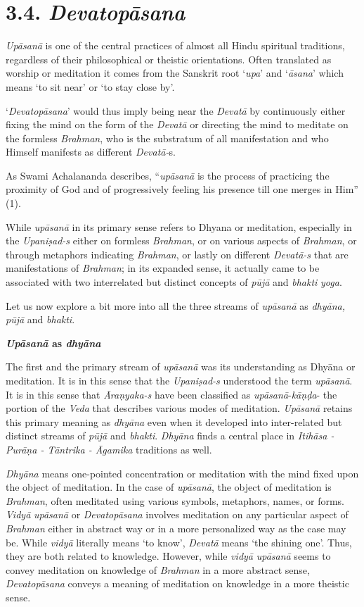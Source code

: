 \section*{3.4. \emph{Devatopāsana}}

\emph{Upāsanā} is one of the central practices of almost all Hindu spiritual traditions, regardless of their philosophical or theistic orientations. Often translated as worship or meditation it comes from the Sanskrit root `\emph{upa}' and `\emph{āsana}' which means `to sit near' or `to stay close by'.

`\emph{Devatopāsana}' would thus imply being near the \emph{Devatā} by continuously either fixing the mind on the form of the \emph{Devatā} or directing the mind to meditate on the formless \emph{Brahman}, who is the substratum of all manifestation and who Himself manifests as different \emph{Devatā-}s.

As Swami Achalananda describes, ``\emph{upāsanā} is the process of practicing the proximity of God and of progressively feeling his presence till one merges in Him'' (1).

While \emph{upāsanā} in its primary sense refers to Dhyana or meditation, especially in the \emph{Upaniṣad-s} either on formless \emph{Brahman}, or on various aspects of \emph{Brahman}, or through metaphors indicating \emph{Brahman}, or lastly on different \emph{Devatā-s} that are manifestations of \emph{Brahman}; in its expanded sense, it actually came to be associated with two interrelated but distinct concepts of \emph{pūjā} and \emph{bhakti} \emph{yoga}.

Let us now explore a bit more into all the three streams of \emph{upāsanā} as \emph{dhyāna, pūjā} and \emph{bhakti}.
\medskip

\textbf{\emph{Upāsanā} as \emph{dhyāna}}

The first and the primary stream of \emph{upāsanā} was its understanding as Dhyāna or meditation. It is in this sense that the \emph{Upaniṣad-s} understood the term \emph{upāsanā}. It is in this sense that \emph{Āraṇyaka-s} have been classified as \emph{upāsanā}-\emph{kāṇḍa}- the portion of the \emph{Veda} that describes various modes of meditation. \emph{Upāsanā} retains this primary meaning as \emph{dhyāna} even when it developed into inter-related but distinct streams of \emph{pūjā} and \emph{bhakti}. \emph{Dhyāna} finds a central place in \emph{Itihāsa - Purāṇa - Tāntrika - Āgamika} traditions as well.

\emph{Dhyāna} means one-pointed concentration or meditation with the mind fixed upon the object of meditation. In the case of \emph{upāsanā}, the object of meditation is \emph{Brahman}, often meditated using various symbols, metaphors, names, or forms. \emph{Vidyā} \emph{upāsanā} or \emph{Devatopāsana} involves meditation on any particular aspect of \emph{Brahman} either in abstract way or in a more personalized way as the case may be. While \emph{vidyā} literally means `to know', \emph{Devatā} means `the shining one'. Thus, they are both related to knowledge. However, while \emph{vidyā} \emph{upāsanā} seems to convey meditation on knowledge of \emph{Brahman} in a more abstract sense, \emph{Devatopāsana} conveys a meaning of meditation on knowledge in a more theistic sense.

